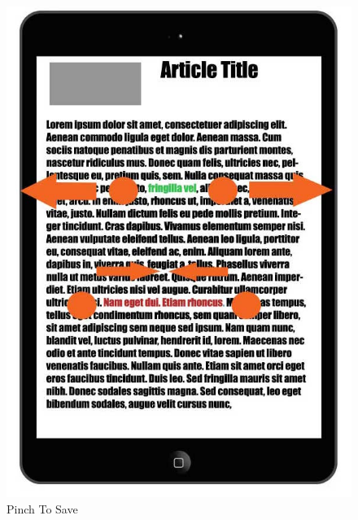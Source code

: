 \documentclass[11pt, oneside]{article}   	%
\begin{document}
\begin{figure}[!hb]
    \centering
    \includegraphics[scale=0.3]{Saving-Pinches.jpg}
    \caption{Pinch To Save}
    \label{fig:Saving-Pinches}
\end{figure}
\end{document}
